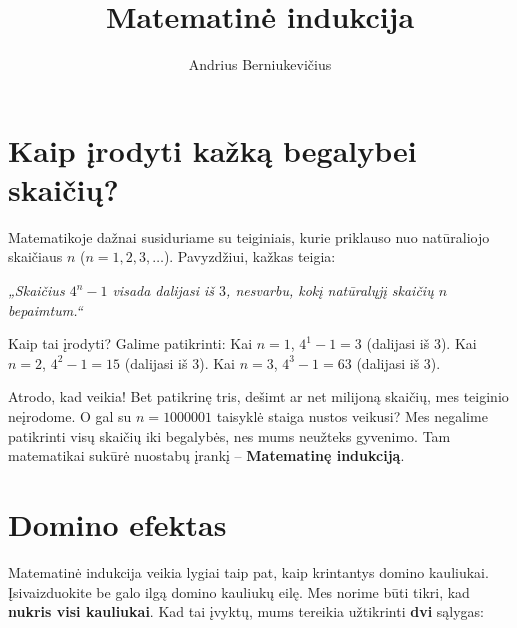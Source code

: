 \documentclass[11pt,a4paper]{scrartcl}
\title{Matematinė indukcija}
\author{Andrius Berniukevičius}
\begin{document}
\maketitle

\section{Kaip įrodyti kažką begalybei skaičių?}

Matematikoje dažnai susiduriame su teiginiais, kurie priklauso nuo natūraliojo skaičiaus $n$ ($n = 1, 2, 3, \dots$).
Pavyzdžiui, kažkas teigia:
\begin{center}
    \textit{„Skaičius $4^n - 1$ visada dalijasi iš $3$, nesvarbu, kokį natūralųjį skaičių $n$ bepaimtum.“}
\end{center}

Kaip tai įrodyti? Galime patikrinti:
Kai $n=1$, $4^1 - 1 = 3$ (dalijasi iš 3).
Kai $n=2$, $4^2 - 1 = 15$ (dalijasi iš 3).
Kai $n=3$, $4^3 - 1 = 63$ (dalijasi iš 3).

Atrodo, kad veikia! Bet patikrinę tris, dešimt ar net milijoną skaičių, mes teiginio neįrodome. O gal su $n = 1000001$ taisyklė staiga nustos veikusi? Mes negalime patikrinti visų skaičių iki begalybės, nes mums neužteks gyvenimo. 
Tam matematikai sukūrė nuostabų įrankį – \textbf{Matematinę indukciją}.

\section{Domino efektas}

Matematinė indukcija veikia lygiai taip pat, kaip krintantys domino kauliukai. Įsivaizduokite be galo ilgą domino kauliukų eilę. Mes norime būti tikri, kad \textbf{nukris visi kauliukai}.
Kad tai įvyktų, mums tereikia užtikrinti \textbf{dvi} sąlygas:
\end{document}
